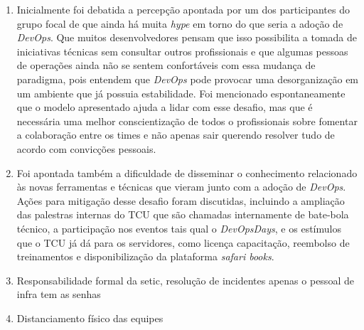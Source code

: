 \begin{enumerate}
\item Inicialmente foi debatida a percepção apontada por um dos participantes do
grupo focal de que ainda há muita {\it hype} em torno do que seria a adoção de
{\it DevOps}. Que muitos desenvolvedores pensam que isso possibilita a tomada de
iniciativas técnicas sem consultar outros profissionais e que algumas pessoas de
operações ainda não se sentem confortáveis com essa mudança de paradigma, pois
entendem que {\it DevOps} pode provocar uma desorganização em um ambiente que já
possuia estabilidade. Foi mencionado espontaneamente que o modelo apresentado
ajuda a lidar com esse desafio, mas que é necessária uma melhor conscientização
de todos o profissionais sobre fomentar a colaboração entre os times e não
apenas sair querendo resolver tudo de acordo com convicções pessoais.

\item Foi apontada também a dificuldade de disseminar o conhecimento relacionado
às novas ferramentas e técnicas que vieram junto com a adoção de {\it DevOps}.
Ações para mitigação desse desafio foram discutidas, incluindo a ampliação das
palestras internas do \acrshort{TCU} que são chamadas internamente de bate-bola
técnico, a participação nos eventos tais qual o \emph{DevOpsDays}, e os estímulos
que o \acrshort{TCU} já dá para os servidores, como licença capacitação,
reembolso de treinamentos e disponibilização da plataforma {\it safari books}.

\item Responsabilidade formal da setic, resolução de incidentes apenas o pessoal
de infra tem as senhas

\item Distanciamento físico das equipes

\end{enumerate}
